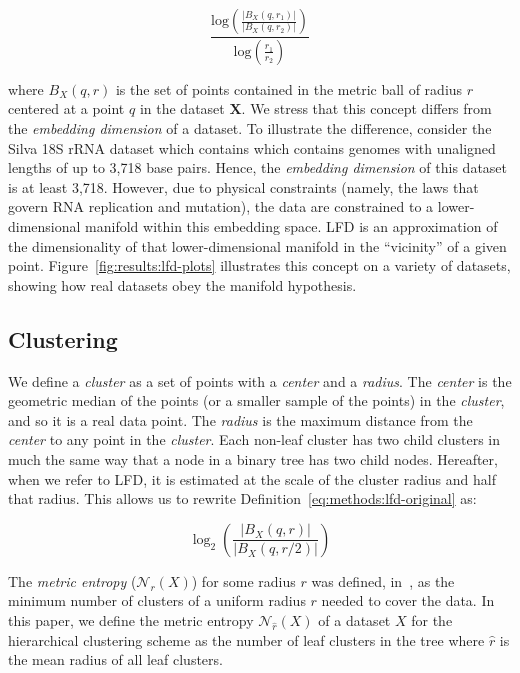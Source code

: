 \begin{equation}
    \frac{\text{log} \left( \frac{|B_X(q, r_1)|}{|B_X(q, r_2)|} \right) }{\text{log} \left( \frac{r_1}{r_2} \right) }
    \label{eq:methods:lfd-original}
\end{equation}

where $B_X(q, r)$ is the set of points contained in the metric ball of radius $r$ centered at a point $q$ in the dataset $\textbf{X}$.
We stress that this concept differs from the \emph{embedding dimension} of a dataset.
To illustrate the difference, consider the Silva 18S rRNA dataset which contains which contains genomes with unaligned lengths of up to 3,718 base pairs.
Hence, the \emph{embedding dimension} of this dataset is at least 3,718.
However, due to physical constraints (namely, the laws that govern RNA replication and mutation), the data are constrained to a lower-dimensional manifold within this embedding space.
LFD is an approximation of the dimensionality of that lower-dimensional manifold in the ``vicinity'' of a given point.
Figure~\ref{fig:results:lfd-plots} illustrates this concept on a variety of datasets, showing how real datasets obey the manifold hypothesis.


\subsection{Clustering}
\label{sec:methods:clustering}

We define a \emph{cluster} as a set of points with a \emph{center} and a \emph{radius}.
The \emph{center} is the geometric median of the points (or a smaller sample of the points) in the \emph{cluster}, and so it is a real data point.
The \emph{radius} is the maximum distance from the \emph{center} to any point in the \emph{cluster}.
Each non-leaf cluster has two child clusters in much the same way that a node in a binary tree has two child nodes.
Hereafter, when we refer to LFD, it is estimated at the scale of the cluster radius and half that radius.
This allows us to rewrite Definition~\ref{eq:methods:lfd-original} as:

\begin{equation}
    \log_2 \left( \frac{|B_X(q, r)|}{|B_X(q, r/2)|} \right)
    \label{eq:methods:lfd-simplified}
\end{equation}

The \emph{metric entropy} ($\mathcal{N}_{r}(X)$) for some radius $r$ was defined, in~\cite{yu2015entropy}, as the minimum number of clusters of a uniform radius $r$ needed to cover the data.
In this paper, we define the metric entropy $\mathcal{N}_{\hat{r}}(X)$ of a dataset $X$ for the hierarchical clustering scheme as the number of leaf clusters in the tree where $\hat{r}$ is the mean radius of all leaf clusters.

